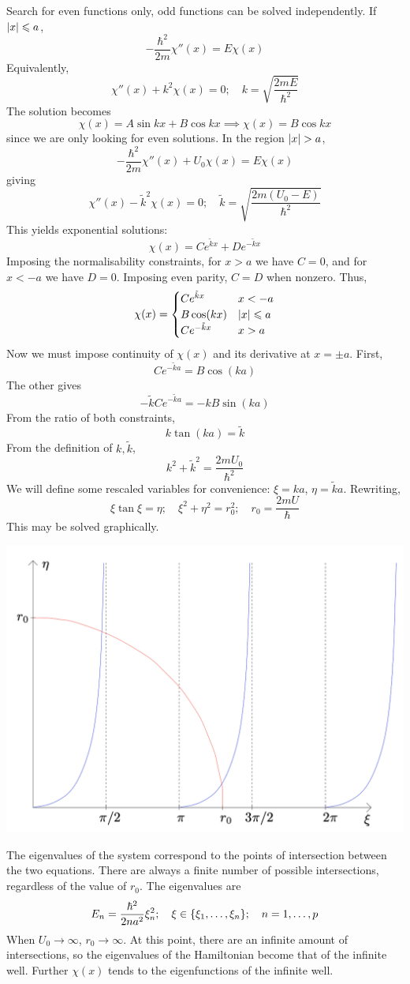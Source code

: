 \documentclass[a4paper]{article}
\begin{document}
Search for even functions only, odd functions can be solved independently.
If \( \abs{x} \leqslant a \),
\[
	-\frac{\hbar^2}{2m} \chi''(x) = E\chi(x)
\]
Equivalently,
\[
	\chi''(x) + k^2 \chi(x) = 0;\quad k = \sqrt{\frac{2mE}{\hbar^2}}
\]
The solution becomes
\[
	\chi(x) = A \sin kx + B \cos kx \implies \chi(x) = B \cos kx
\]
since we are only looking for even solutions.
In the region \( \abs{x} > a \),
\[
	-\frac{\hbar^2}{2m} \chi''(x) + U_0 \chi(x) = E \chi(x)
\]
giving
\[
	\chi''(x) - \tilde k^2 \chi(x) = 0;\quad \tilde k = \sqrt{\frac{2m(U_0 - E)}{\hbar^2}}
\]
This yields exponential solutions:
\[
	\chi(x) = C e^{\tilde k x} + D e^{-\tilde k x}
\]
Imposing the normalisability constraints, for \( x > a \) we have \( C = 0 \), and for \( x < -a \) we have \( D = 0 \).
Imposing even parity, \( C = D \) when nonzero.
Thus,
\[
	\chi(x) = \begin{cases}
		C e^{\tilde k x}  & x < -a         \\
		B \cos(kx)           & \abs{x} \leqslant a \\
		C e^{-\tilde k x} & x > a
	\end{cases}
\]
Now we must impose continuity of \( \chi(x) \) and its derivative at \( x = \pm a \).
First,
\[
	C e^{-\tilde k a} = B \cos(k a)
\]
The other gives
\[
	-\tilde k C e^{-\tilde k a} = -k B \sin(k a)
\]
From the ratio of both constraints,
\[
	k \tan (ka) = \tilde k
\]
From the definition of \( k, \tilde k \),
\[
	k^2 + \tilde k^2 = \frac{2mU_0}{\hbar^2}
\]
We will define some rescaled variables for convenience: \( \xi = ka \), \( \eta = \tilde k a \).
Rewriting,
\[
	\xi \tan \xi = \eta;\quad \xi^2 + \eta^2 = r_0^2;\quad r_0 = \frac{2mU}{\hbar}
\]
This may be solved graphically.
\begin{center}
    \includegraphics[scale=0.25]{qm7.png}
\end{center}
The eigenvalues of the system correspond to the points of intersection between the two equations.
There are always a finite number of possible intersections, regardless of the value of \( r_0 \).
The eigenvalues are
\[
	E_n = \frac{\hbar^2}{2 n a^2} \xi_n^2;\quad \xi \in \qty{\xi_1, \dots, \xi_n};\quad n = 1, \dots, p
\]
When \( U_0 \to \infty \), \( r_0 \to \infty \).
At this point, there are an infinite amount of intersections, so the eigenvalues of the Hamiltonian become that of the infinite well.
Further \( \chi(x) \) tends to the eigenfunctions of the infinite well.
\end{document}

